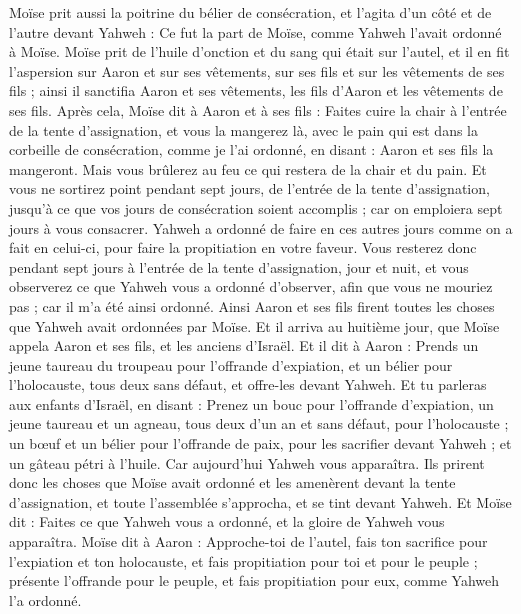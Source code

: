 \begin{multicols}{2}
Moïse prit aussi la poitrine du bélier de consécration, et l'agita d'un côté et de l'autre devant Yahweh : Ce fut la part de Moïse, comme Yahweh l'avait ordonné à Moïse.
Moïse prit de l'huile d'onction et du sang qui était sur l'autel, et il en fit l'aspersion sur Aaron et sur ses vêtements, sur ses fils et sur les vêtements de ses fils ; ainsi il sanctifia Aaron et ses vêtements, les fils d'Aaron et les vêtements de ses fils.
Après cela, Moïse dit à Aaron et à ses fils : Faites cuire la chair à l'entrée de la tente d'assignation, et vous la mangerez là, avec le pain qui est dans la corbeille de consécration, comme je l'ai ordonné, en disant : Aaron et ses fils la mangeront.
Mais vous brûlerez au feu ce qui restera de la chair et du pain.
Et vous ne sortirez point pendant sept jours, de l'entrée de la tente d'assignation, jusqu'à ce que vos jours de consécration soient accomplis ; car on emploiera sept jours à vous consacrer.
Yahweh a ordonné de faire en ces autres jours comme on a fait en celui-ci, pour faire la propitiation en votre faveur.
Vous resterez donc pendant sept jours à l'entrée de la tente d'assignation, jour et nuit, et vous observerez ce que Yahweh vous a ordonné d'observer, afin que vous ne mouriez pas ; car il m'a été ainsi ordonné.
Ainsi Aaron et ses fils firent toutes les choses que Yahweh avait ordonnées par Moïse.
\VerseOne{}Et il arriva au huitième jour, que Moïse appela Aaron et ses fils, et les anciens d'Israël.
Et il dit à Aaron : Prends un jeune taureau du troupeau pour l'offrande d'expiation, et un bélier pour l'holocauste, tous deux sans défaut, et offre-les devant Yahweh.
Et tu parleras aux enfants d'Israël, en disant : Prenez un bouc pour l'offrande d'expiation, un jeune taureau et un agneau, tous deux d'un an et sans défaut, pour l'holocauste ;
un bœuf et un bélier pour l'offrande de paix, pour les sacrifier devant Yahweh ; et un gâteau pétri à l'huile. Car aujourd'hui Yahweh vous apparaîtra.
Ils prirent donc les choses que Moïse avait ordonné et les amenèrent devant la tente d'assignation, et toute l'assemblée s'approcha, et se tint devant Yahweh.
Et Moïse dit : Faites ce que Yahweh vous a ordonné, et la gloire de Yahweh vous apparaîtra.
Moïse dit à Aaron : Approche-toi de l'autel, fais ton sacrifice pour l'expiation et ton holocauste, et fais propitiation pour toi et pour le peuple ; présente l'offrande pour le peuple, et fais propitiation pour eux, comme Yahweh l'a ordonné.

\end{multicols}
